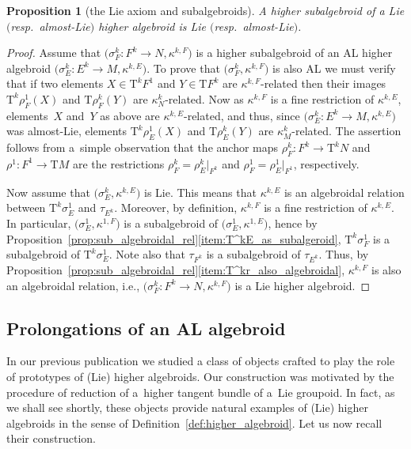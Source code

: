 \documentclass[pdftex]{sigma}
\newcommand{\ra}{\rightarrow}
\newcommand{\T}{\mathrm{T}} %
\newcommand{\TT}[1]{\mathrm{T}^{#1}} %
\numberwithin{equation}{section}
\newtheorem{prop}[thm]{Proposition}
\theoremstyle{definition}
\begin{document}
 \begin{prop}[the Lie axiom and subalgebroids] \label{prop:sub_HA_is_Lie} A higher subalgebroid of a Lie $($resp.\ almost-Lie$)$ higher algebroid is Lie $($resp.\ almost-Lie$)$.
\end{prop}
\begin{proof} Assume that $\big(\sigma^k_F\colon F^k\ra N, \kappa^{k,F}\big)$ is a higher subalgebroid of an AL higher algebroid $\big(\sigma^k_E\colon E^k\ra M, \kappa^{k,E}\big)$. To prove that $\big(\sigma^k_F, \kappa^{k,F}\big)$ is also AL we must verify that if two elements $X\in \TT{k} F^1$ and $Y\in \T F^k$ are $\kappa^{k,F}$-related then their images $\TT{k} \rho^1_F (X)$ and $\T\rho^k_F(Y)$ are $\kappa^k_{ N}$-related. Now as $\kappa^{k,F}$ is a fine restriction of $\kappa^{k,E}$, elements~$X$ and~$Y$ as above are $\kappa^{k,E}$-related, and thus, since $\big(\sigma^k_E\colon E^k\ra M, \kappa^{k,E}\big)$ was almost-Lie, elements $\TT{k} \rho^1_E (X)$ and $\T\rho^k_E(Y)$ are $\kappa^k_M$-related. The assertion follows from a~simple observation that the anchor { maps} $\rho^k_F\colon F^k\ra \TT{k} N$ and $\rho^1\colon F^1\ra \T M$ are the restrictions $\rho^k_F=\rho^k_E|_{F^k}$ and $\rho^1_F=\rho^1_E|_{F^1}$, respectively.

Now assume that $\big(\sigma^k_E, \kappa^{k,E}\big)$ is Lie. This means that $\kappa^{k,E}$ is an algebroidal relation between $\TT{k}\sigma^1_E$ and $\tau_{E^k}$. Moreover, by definition, $ \kappa^{k,F}$ is a fine restriction of $\kappa^{k,E}$. In particular, $\big(\sigma^1_E, \kappa^{1, F}\big)$ is a subalgebroid of $\big(\sigma^1_E, \kappa^{1, E}\big)$, hence by Proposition~\ref{prop:sub_algebroidal_rel}\eqref{item:T^kE_as_subalgeroid}, $\TT{k}\sigma^1_F$ is a subalgebroid of $\TT{k}\sigma^1_E$. Note also that $\tau_{F^k}$ is a subalgebroid of $\tau_{E^k}$. Thus, by Proposition~\ref{prop:sub_algebroidal_rel}\eqref{item:T^kr_also_algebroidal}, $\kappa^{k,F}$ is also an algebroidal relation, i.e., $\big(\sigma^k_F\colon F^k\ra N, \kappa^{k,F}\big)$ is a Lie higher algebroid.
\end{proof}

\subsection{Prolongations of an AL algebroid}\label{ssec:prolongations}
In our previous publication \cite{MJ_MR_models_high_alg_2015} we studied a class of objects crafted to play the role of prototypes of (Lie) higher algebroids. Our construction was motivated by the procedure of reduction of a~higher tangent bundle of a~Lie groupoid. In fact, as we shall see shortly, these objects provide natural examples of (Lie) higher algebroids in the sense of Definition~\ref{def:higher_algebroid}. Let us now recall their construction.
\end{document}
